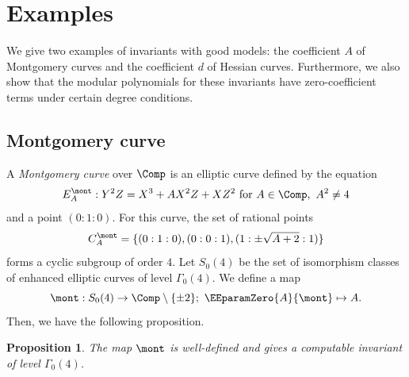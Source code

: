 \documentclass{amsart}
\newtheorem{proposition}[theorem]{Proposition}
\theoremstyle{definition}
\theoremstyle{remark}
\numberwithin{equation}{section}
\begin{document}
\fi

\section{Examples}\label{sec:examples}
We give two examples of invariants with good models:
the coefficient $A$ of Montgomery curves
and the coefficient $d$ of Hessian curves.
Furthermore, we also show that the modular polynomials for these invariants
have zero-coefficient terms under certain degree conditions.

\subsection{Montgomery curve}\label{subsec:montgomery}
A \emph{Montgomery curve} over $\Comp$ is an elliptic curve defined by
the equation
\begin{equation*}
    E_A^\mont : Y^2Z = X^3 + A X^2 Z + X Z^2 \text{ for } A \in \Comp,\ A^2 \neq 4
\end{equation*}
and a point $(0 : 1 : 0)$.
For this curve,
the set of rational points
\begin{equation*}
    C_A^\mont = \{(0:1:0), (0:0:1), (1 : \pm\sqrt{A + 2}: 1)\}
\end{equation*}
forms a cyclic subgroup of order $4$.
Let $S_0(4)$ be the set of isomorphism classes of
enhanced elliptic curves of level $\Gamma_0(4)$.
We define a map
\begin{equation*}
    \mont : S_0(4) \to \Comp \setminus \{\pm 2\};\
    \EEparamZero{A}{\mont} \mapsto A.
\end{equation*}
Then, we have the following proposition.
\begin{proposition}\label{prop:montgomery_well_defined}
    The map $\mont$ is well-defined
    and gives
    a computable invariant of level $\Gamma_0(4)$.
\end{proposition}
\end{document}
